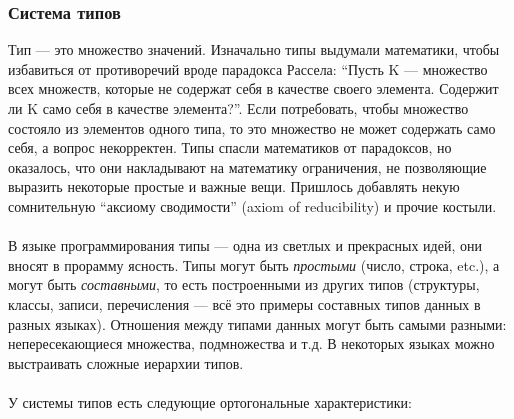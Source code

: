 \documentclass[11pt]{book}
\begin{document}
\subsubsection{Система типов}
Тип --- это множество значений.
Изначально типы выдумали математики, чтобы избавиться от противоречий вроде парадокса Рассела:
``Пусть K — множество всех множеств, которые не содержат себя в качестве своего элемента. Содержит ли K само себя в качестве элемента?''.
Если потребовать, чтобы множество состояло из элементов одного типа, то это множество не может содержать само себя,
а вопрос некорректен.
Типы спасли математиков от парадоксов, но оказалось, что они накладывают на математику ограничения,
не позволяющие выразить некоторые простые и важные вещи.
Пришлось добавлять некую сомнительную ``аксиому сводимости'' (axiom of reducibility) и прочие костыли.
\\ \\
В языке программирования типы --- одна из светлых и прекрасных идей, они вносят в прорамму ясность.
Типы могут быть \emph{простыми} (число, строка, etc.),
а могут быть \emph{составными}, то есть построенными из других типов (структуры, классы, записи, перечисления ---
всё это примеры составных типов данных в разных языках).
Отношения между типами данных могут быть самыми разными: непересекающиеся множества, подмножества и т.д.
В некоторых языках можно выстраивать сложные иерархии типов.
\\ \\
У системы типов есть следующие ортогональные характеристики:
\end{document}
